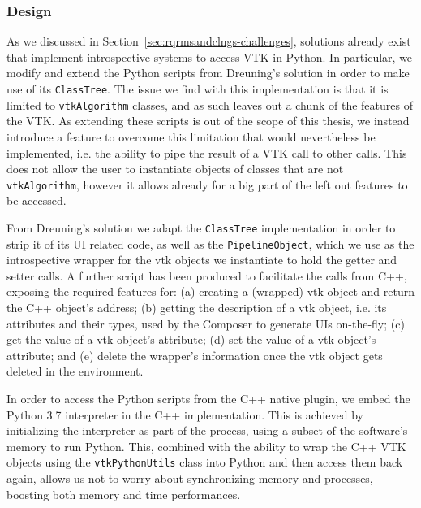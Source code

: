 \subsubsection{Design}

As we discussed in Section~\ref{sec:rqrmsandclngs-challenges}, solutions already exist that implement introspective systems to access VTK in Python. In particular, we modify and extend the Python scripts from Dreuning's solution in order to make use of its \verb|ClassTree|. The issue we find with this implementation is that it is limited to \verb|vtkAlgorithm| classes, and as such leaves out a chunk of the features of the VTK. As extending these scripts is out of the scope of this thesis, we instead introduce a feature to overcome this limitation that would nevertheless be implemented, i.e. the ability to pipe the result of a VTK call to other calls. This does not allow the user to instantiate objects of classes that are not \verb|vtkAlgorithm|, however it allows already for a big part of the left out features to be accessed.

From Dreuning's solution we adapt the \verb|ClassTree| implementation in order to strip it of its UI related code, as well as the \verb|PipelineObject|, which we use as the introspective wrapper for the \acrshort{vtk} objects we instantiate to hold the getter and setter calls. A further script has been produced to facilitate the calls from C++, exposing the required features for: (a) creating a (wrapped) \acrshort{vtk} object and return the C++ object's address; (b) getting the description of a \acrshort{vtk} object, i.e. its attributes and their types, used by the Composer to generate UIs on-the-fly; (c) get the value of a \acrshort{vtk} object's attribute; (d) set the value of a \acrshort{vtk} object's attribute; and (e) delete the wrapper's information once the \acrshort{vtk} object gets deleted in the environment. 

In order to access the Python scripts from the C++ native plugin, we embed the Python 3.7 interpreter in the C++ implementation. This is achieved by initializing the interpreter as part of the process, using a subset of the software's memory to run Python. This, combined with the ability to wrap the C++ VTK objects using the \verb|vtkPythonUtils| class into Python and then access them back again, allows us not to worry about synchronizing memory and processes, boosting both memory and time performances.

